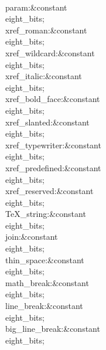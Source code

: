 \\{param}\?:\?\&{constant}\8\\{eight\_bits}\?\K{}\?;\6
\\{xref\_roman}\?:\?\&{constant}\8\\{eight\_bits}\?\K{}\?;\6
\\{xref\_wildcard}\?:\?\&{constant}\8\\{eight\_bits}\?\K{}\?;%
\6
\\{xref\_italic}\?:\?\&{constant}\8\\{eight\_bits}\?\K{}\?;\6
\\{xref\_bold\_face}\?:\?\&{constant}\8\\{eight\_bits}\?\K{}\?;%
\6
\\{xref\_slanted}\?:\?\&{constant}\8\\{eight\_bits}\?\K{}\?;\6
\\{xref\_typewriter}\?:\?\&{constant}\8\\{eight\_bits}\?\K{}\?;%
\6
\\{xref\_predefined}\?:\?\&{constant}\8\\{eight\_bits}\?\K{}\?;%
\6
\\{xref\_reserved}\?:\?\&{constant}\8\\{eight\_bits}\?\K{}\?;%
\6
\\{TeX\_string}\?:\?\&{constant}\8\\{eight\_bits}\?\K{}\?;\6
\\{join}\?:\?\&{constant}\8\\{eight\_bits}\?\K{}\?;\6
\\{thin\_space}\?:\?\&{constant}\8\\{eight\_bits}\?\K{}\?;\6
\\{math\_break}\?:\?\&{constant}\8\\{eight\_bits}\?\K{}\?;\6
\\{line\_break}\?:\?\&{constant}\8\\{eight\_bits}\?\K{}\?;\6
\\{big\_line\_break}\?:\?\&{constant}\8\\{eight\_bits}\?\K{}\?;%
